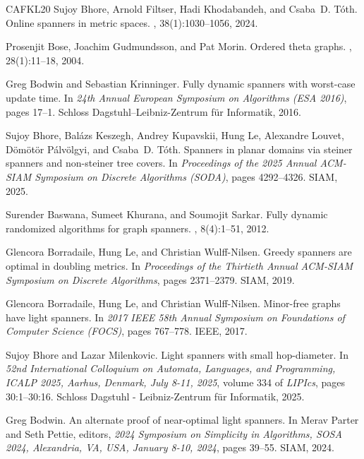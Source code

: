 \documentclass[11pt]{article}
\begin{document}
\begin{thebibliography}{CAFKL20}
Sujoy Bhore, Arnold Filtser, Hadi Khodabandeh, and Csaba~D. T{\'{o}}th.
\newblock Online spanners in metric spaces.
, 38(1):1030--1056, 2024.

Prosenjit Bose, Joachim Gudmundsson, and Pat Morin.
\newblock Ordered theta graphs.
, 28(1):11--18, 2004.

Greg Bodwin and Sebastian Krinninger.
\newblock Fully dynamic spanners with worst-case update time.
\newblock In {\em 24th Annual European Symposium on Algorithms (ESA 2016)},
  pages 17--1. Schloss Dagstuhl--Leibniz-Zentrum f{\"u}r Informatik, 2016.

Sujoy Bhore, Bal{\'{a}}zs Keszegh, Andrey Kupavskii, Hung Le, Alexandre Louvet,
  D{\"{o}}m{\"{o}}t{\"{o}}r P{\'{a}}lv{\"{o}}lgyi, and Csaba~D. T{\'{o}}th.
\newblock Spanners in planar domains via steiner spanners and non-steiner tree
  covers.
\newblock In {\em Proceedings of the 2025 Annual {ACM-SIAM} Symposium on
  Discrete Algorithms (SODA)}, pages 4292--4326. {SIAM}, 2025.

Surender Baswana, Sumeet Khurana, and Soumojit Sarkar.
\newblock Fully dynamic randomized algorithms for graph spanners.
, 8(4):1--51, 2012.

Glencora Borradaile, Hung Le, and Christian {Wulff-Nilsen}.
\newblock Greedy spanners are optimal in doubling metrics.
\newblock In {\em Proceedings of the {T}hirtieth {A}nnual {ACM}-{SIAM}
  {S}ymposium on {D}iscrete {A}lgorithms}, pages 2371--2379. SIAM, 2019.

Glencora Borradaile, Hung Le, and Christian Wulff-Nilsen.
\newblock Minor-free graphs have light spanners.
\newblock In {\em 2017 IEEE 58th Annual Symposium on Foundations of Computer
  Science (FOCS)}, pages 767--778. IEEE, 2017.

Sujoy Bhore and Lazar Milenkovic.
\newblock Light spanners with small hop-diameter.
\newblock In {\em 52nd International Colloquium on Automata, Languages, and
  Programming, {ICALP} 2025, Aarhus, Denmark, July 8-11, 2025}, volume 334 of
  {\em LIPIcs}, pages 30:1--30:16. Schloss Dagstuhl - Leibniz-Zentrum f{\"{u}}r
  Informatik, 2025.

Greg Bodwin.
\newblock An alternate proof of near-optimal light spanners.
\newblock In Merav Parter and Seth Pettie, editors, {\em 2024 Symposium on
  Simplicity in Algorithms, {SOSA} 2024, Alexandria, VA, USA, January 8-10,
  2024}, pages 39--55. {SIAM}, 2024.


\end{thebibliography}
\end{document}
